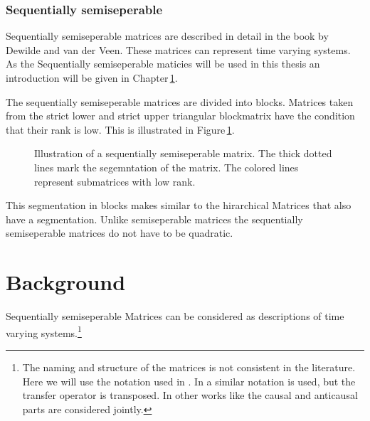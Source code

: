 \documentclass[doctype=mastersthesis,BCOR=15mm,biblatex]{ldvbook}%
\begin{document}
\subsection{Sequentially semiseperable}
Sequentially semiseperable matrices are described in detail in the book by Dewilde and van der Veen\cite{dewilde_time-varying_1998}.
These matrices can represent time varying systems.
As the Sequentially semiseperable maticies will be used in this thesis an introduction will be given in Chapter\,\ref{chap:background}. 

The sequentially semiseperable matrices are divided into blocks.
Matrices taken from the strict lower and strict upper triangular blockmatrix have the condition that their rank is low.
This is illustrated in Figure\,\ref{fig:sequentiallysep}.

\begin{figure}[htb]
	\centering
	
	\caption{Illustration of a sequentially semiseperable matrix. The thick dotted lines mark the segemntation of the matrix. The colored lines represent submatrices with low rank.}
	\label{fig:sequentiallysep}
\end{figure}

This segmentation in blocks makes similar to the hirarchical Matrices that also have a segmentation.
Unlike semiseperable matrices the sequentially semiseperable matrices do not have to be quadratic. 

\chapter{Background}\label{chap:background}


Sequentially semiseperable Matrices can be considered as descriptions of time varying systems.\footnote{
The naming and structure of the matrices is not consistent in the literature.
Here we will use the notation used in \cite{tong_blind_2003}. 
In \cite{dewilde_time-varying_1998} a similar notation is used, but the transfer operator is transposed.
In other works like \cite{rice_efficient_2010,chandrasekaran_fast_2002} the causal and anticausal parts are considered jointly.
}
\end{document}
